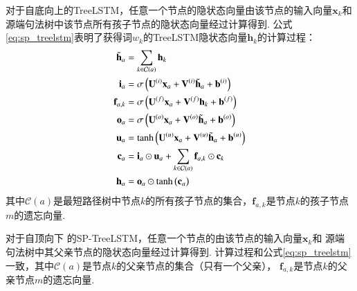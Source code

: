 对于自底向上的TreeLSTM，任意一个节点的隐状态向量由该节点的输入向量$\mathbf{x}_k$和源端句法树中该节点所有孩子节点的隐状态向量经过计算得到.
公式\ref{eq:sp_treelstm}表明了获得词$w_k$的TreeLSTM隐状态向量$\mathbf{h}_k$的计算过程：
\begin{equation}\label{eq:sp_treelstm}
    \begin{split}
        \Tilde{\mathbf{h}}_a &= \sum_{k \in \mathcal{C}(a)} \mathbf{h}_k \\
        \mathbf{i}_a &= \sigma \left( \mathbf{U}^{(i)} \mathbf{x}_a + \mathbf{V}^{(i)} \Tilde{\mathbf{h}}_a + \mathbf{b}^{(i)} \right) \\
        \mathbf{f}_{a,k} &= \sigma \left( \mathbf{U}^{(f)} \mathbf{x}_a +  \mathbf{V}^{(f)} \mathbf{h}_k + \mathbf{b}^{(f)} \right)   \\
        \mathbf{o}_{a} &= \sigma \left( \mathbf{U}^{(o)} \mathbf{x}_a + \mathbf{V}^{(o)} \Tilde{\mathbf{h}}_a + \mathbf{b}^{(o)} \right) \\
        \mathbf{u}_{a} &= \tanh \left( \mathbf{U}^{(u)} \mathbf{x}_a + \mathbf{V}^{(u)} \Tilde{\mathbf{h}}_a + \mathbf{b}^{(u)} \right) \\
        \mathbf{c}_{a} &= \mathbf{i}_a \odot \mathbf{u}_a + \sum_{k \in \mathcal{C}(a)} \mathbf{f}_{a,k} \odot \mathbf{c}_k \\
        \mathbf{h}_{a} &= \mathbf{o}_a \odot \tanh \big(\mathbf{c}_a\big) \\
    \end{split}
\end{equation}
其中$\mathcal{C}(a)$是最短路径树中节点$k$的所有孩子节点的集合，$\mathbf{f}_{a,k}$是节点$k$的孩子节点$m$的遗忘向量.

对于自顶向下 的SP-TreeLSTM，任意一个节点的由该节点的输入向量$\mathbf{x}_k$和
源端句法树中其父亲节点的隐状态向量经过计算得到.
计算过程和公式\ref{eq:sp_treelstm}一致，其中$\mathcal{C}(a)$是节点$k$的父亲节点的集合（只有一个父亲），
$\mathbf{f}_{a,k}$是节点$k$的父亲节点$m$的遗忘向量.


